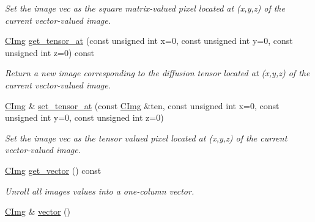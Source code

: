 \begin{DoxyCompactItemize}
\begin{DoxyCompactList}\small\item\em Set the image {\ttfamily vec} as the {\itshape square} {\itshape matrix-\/valued} pixel located at ({\ttfamily x},{\ttfamily y},{\ttfamily z}) of the current vector-\/valued image. \end{DoxyCompactList}\item 
\hypertarget{structcimg__library_1_1_c_img_ab6b97231d7be6d16aa5d17ad061f99a5}{\hyperlink{structcimg__library_1_1_c_img}{C\-Img} \hyperlink{structcimg__library_1_1_c_img_ab6b97231d7be6d16aa5d17ad061f99a5}{get\-\_\-tensor\-\_\-at} (const unsigned int x=0, const unsigned int y=0, const unsigned int z=0) const }\label{structcimg__library_1_1_c_img_ab6b97231d7be6d16aa5d17ad061f99a5}

\begin{DoxyCompactList}\small\item\em Return a new image corresponding to the {\itshape diffusion} {\itshape tensor} located at ({\ttfamily x},{\ttfamily y},{\ttfamily z}) of the current vector-\/valued image. \end{DoxyCompactList}\item 
\hypertarget{structcimg__library_1_1_c_img_ac199c9b30cc745b03c5f9bf3a1c4e7d4}{\hyperlink{structcimg__library_1_1_c_img}{C\-Img} \& \hyperlink{structcimg__library_1_1_c_img_ac199c9b30cc745b03c5f9bf3a1c4e7d4}{set\-\_\-tensor\-\_\-at} (const \hyperlink{structcimg__library_1_1_c_img}{C\-Img} \&ten, const unsigned int x=0, const unsigned int y=0, const unsigned int z=0)}\label{structcimg__library_1_1_c_img_ac199c9b30cc745b03c5f9bf3a1c4e7d4}

\begin{DoxyCompactList}\small\item\em Set the image {\ttfamily vec} as the {\itshape tensor} {\itshape valued} pixel located at ({\ttfamily x},{\ttfamily y},{\ttfamily z}) of the current vector-\/valued image. \end{DoxyCompactList}\item 
\hypertarget{structcimg__library_1_1_c_img_a40c36a5a4aa50670018120bf265e1f14}{\hyperlink{structcimg__library_1_1_c_img}{C\-Img} \hyperlink{structcimg__library_1_1_c_img_a40c36a5a4aa50670018120bf265e1f14}{get\-\_\-vector} () const }\label{structcimg__library_1_1_c_img_a40c36a5a4aa50670018120bf265e1f14}

\begin{DoxyCompactList}\small\item\em Unroll all images values into a one-\/column vector. \end{DoxyCompactList}\item 
\hypertarget{structcimg__library_1_1_c_img_af3e87195486eb3a3950c6022be3d6cc5}{\hyperlink{structcimg__library_1_1_c_img}{C\-Img} \& \hyperlink{structcimg__library_1_1_c_img_af3e87195486eb3a3950c6022be3d6cc5}{vector} ()}\label{structcimg__library_1_1_c_img_af3e87195486eb3a3950c6022be3d6cc5}


\end{DoxyCompactItemize}
